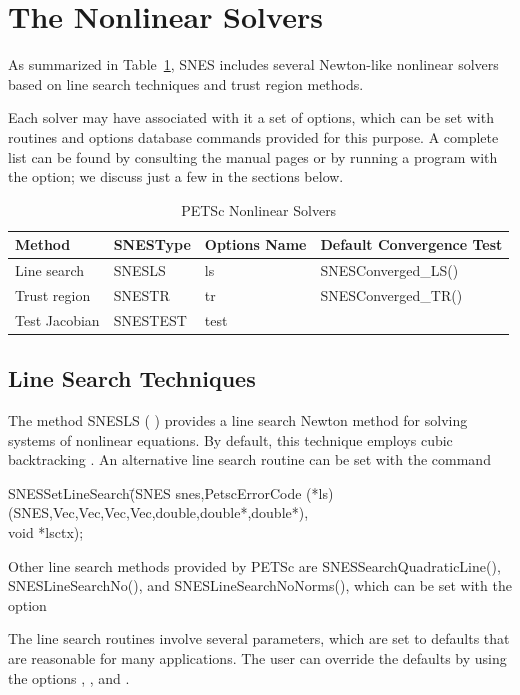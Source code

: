 \section{The Nonlinear Solvers}
\label{sec_nlsolvers}

As summarized in Table~\ref{tab_snesdefaults}, SNES includes several
Newton-like nonlinear solvers based on line search techniques and
trust region methods.

Each solver may have associated with it a set of options, which can be
set with routines and options database commands provided for this
purpose.  A complete list can be found by consulting the manual pages
or by running a program with the  option; we discuss just a
few in the sections below.

\begin{table}
\begin{center}
\begin{tabular}{llll}
{\bf Method}    &{\bf SNESType}& {\bf Options Name}    &{\bf Default Convergence Test}\\
\hline
Line search     & SNESLS   & ls   & SNESConverged\_LS()\\
Trust region    & SNESTR   & tr   & SNESConverged\_TR()\\
Test Jacobian   & SNESTEST        & test  & \\
\hline
\end{tabular}
\end{center}
\caption{PETSc Nonlinear Solvers}
\label{tab_snesdefaults}
\end{table}

\subsection{Line Search Techniques} 

The method SNESLS ( ) provides a line
search Newton method for solving systems of nonlinear equations.  By
default, this technique employs cubic backtracking \cite{dennis:83}.
An alternative line search routine can be set with the command
\begin{tabbing}
  SNESSetLineSearch\=(SNES snes,PetscErrorCode (*ls)(SNES,Vec,Vec,Vec,Vec,double,double*,double*),\\
                   \>void *lsctx);
\end{tabbing}
Other line search methods provided by PETSc are 
SNESSearchQuadraticLine(), SNESLineSearchNo(), and SNESLineSearchNoNorms(),
which can be set with the option 
\begin{tabbing}
\end{tabbing}
The line search routines involve several parameters, which are set
to defaults that are reasonable for many applications.  The user
can override the defaults by using the options
, 
, and 
. 

